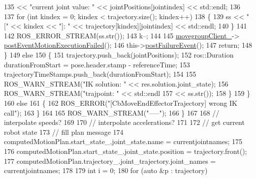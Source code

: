 \begin{DoxyCode}
135                        << \textcolor{stringliteral}{"current joint value: "} << jointPositions[jointindex] << std::endl;
136 
137                     \textcolor{keywordflow}{for} (\textcolor{keywordtype}{int} kindex = 0; kindex < trajectory.size(); kindex++)
138                     \{
139                         ss << \textcolor{stringliteral}{"["} << kindex << \textcolor{stringliteral}{"]: "} << trajectory[kindex][jointindex] << std::endl;
140                     \}
141 
142                     ROS\_ERROR\_STREAM(ss.str());
143                     k--;
144 
145                     \hyperlink{classcl__move__group__interface_1_1CbMoveEndEffectorTrajectory_aea650d3e7836125b32be97392b71a7f3}{movegroupClient\_}->
      \hyperlink{classcl__move__group__interface_1_1ClMoveGroup_a39dc3871d29b2af1ab739057f6ca6daa}{postEventMotionExecutionFailed}();
146                     this->\hyperlink{classsmacc_1_1SmaccAsyncClientBehavior_af6fa358cb1ab5ed16791a201f59260e0}{postFailureEvent}();
147                     \textcolor{keywordflow}{return};
148                 \}
149                 \textcolor{keywordflow}{else}
150                 \{
151                     trajectory.push\_back(jointPositions);
152                     ros::Duration durationFromStart = pose.header.stamp - referenceTime;
153                     trajectoryTimeStamps.push\_back(durationFromStart);
154 
155                     ROS\_WARN\_STREAM(\textcolor{stringliteral}{"IK solution: "} << res.solution.joint\_state);
156                     ROS\_WARN\_STREAM(\textcolor{stringliteral}{"trajpoint: "} << std::endl
157                                                   << ss.str());
158                 \}
159             \}
160             \textcolor{keywordflow}{else}
161             \{
162                 ROS\_ERROR(\textcolor{stringliteral}{"[CbMoveEndEffectorTrajectory] wrong IK call"});
163             \}
164 
165             ROS\_WARN\_STREAM(\textcolor{stringliteral}{"-----"});
166         \}
167 
168         \textcolor{comment}{// interpolate speeds?}
169 
170         \textcolor{comment}{// interpolate accelerations?}
171 
172         \textcolor{comment}{// get current robot state}
173         \textcolor{comment}{// fill plan message}
174         computedMotionPlan.start\_state\_.joint\_state.name = currentjointnames;
175 
176         computedMotionPlan.start\_state\_.joint\_state.position = trajectory.front();
177         computedMotionPlan.trajectory\_.joint\_trajectory.joint\_names = currentjointnames;
178 
179         \textcolor{keywordtype}{int} i = 0;
180         \textcolor{keywordflow}{for} (\textcolor{keyword}{auto} &p : trajectory)

\end{DoxyCode}
